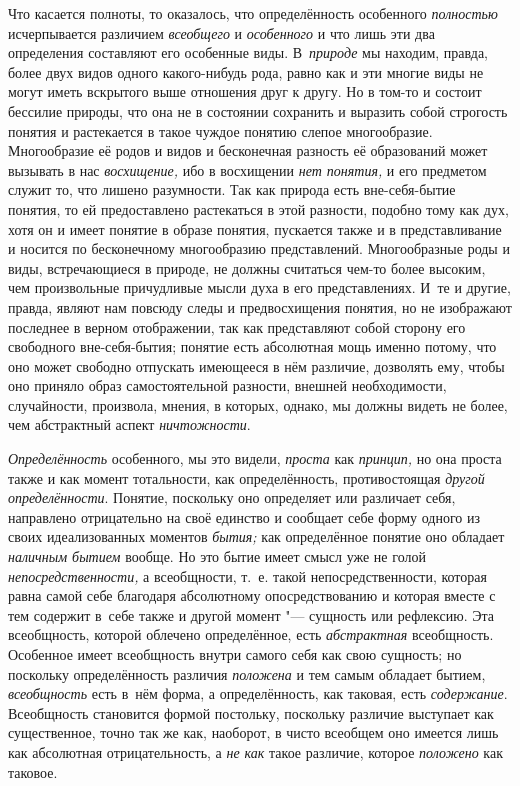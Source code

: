 Что касается полноты, то оказалось, что определённость особенного
{\em полностью} исчерпывается различием {\em всеобщего} и {\em особенного}
и что лишь эти два определения составляют его особенные виды.
В~{\em природе} мы находим,
правда, более двух видов одного какого-нибудь рода, равно как и эти многие
виды не могут иметь вскрытого выше отношения друг к другу. Но в том-то и
состоит бессилие природы, что она не в состоянии сохранить и выразить собой
строгость понятия и растекается в такое чуждое понятию слепое многообразие.
Многообразие её родов и видов и бесконечная разность её образований может
вызывать в нас {\em восхищение,} ибо в восхищении {\em нет
понятия,} и его предметом служит то, что лишено разумности.
Так как природа есть вне-себя-бытие понятия, то ей предоставлено
растекаться в этой разности, подобно тому как дух, хотя он и имеет понятие
в образе понятия, пускается также и в представливание и носится по
бесконечному многообразию представлений. Многообразные роды и виды,
встречающиеся в природе, не должны считаться чем-то более высоким, чем
произвольные причудливые мысли духа в его представлениях. И~те и другие,
правда, являют нам повсюду следы и предвосхищения понятия, но не изображают
последнее в верном отображении, так как представляют собой сторону его
свободного вне-себя-бытия; понятие есть абсолютная мощь именно потому, что
оно может свободно отпускать имеющееся в нём различие, дозволять ему, чтобы
оно приняло образ самостоятельной разности, внешней необходимости,
случайности, произвола, мнения, в которых, однако, мы должны видеть не
более, чем абстрактный аспект {\em ничтожности}.

{\em Определённость} особенного, мы это видели, {\em проста} как {\em принцип,}
но она проста также и как момент тотальности, как определённость,
противостоящая {\em другой определённости}.
Понятие, поскольку оно определяет или различает себя,
направлено отрицательно на своё единство и сообщает себе форму одного из
своих идеализованных моментов {\em бытия;} как
определённое понятие оно обладает {\em наличным бытием}
вообще. Но это бытие имеет смысл уже не голой {\em непосредственности,}
а всеобщности, т.~е. такой непосредственности, которая равна
самой себе благодаря абсолютному опосредствованию и которая вместе с тем
содержит в~себе также и другой момент "--- сущность или
рефлексию. Эта всеобщность, которой облечено определённое, есть
{\em абстрактная} всеобщность. Особенное имеет всеобщность внутри самого себя
как свою сущность; но поскольку определённость различия {\em положена} и тем
самым обладает бытием, {\em всеобщность} есть
в~нём форма, а определённость, как таковая, есть {\em содержание}.
Всеобщность становится формой постольку, поскольку различие
выступает как существенное, точно так же как, наоборот, в чисто всеобщем
оно имеется лишь как абсолютная отрицательность, а {\em не как} такое
различие, которое {\em положено} как таковое.

